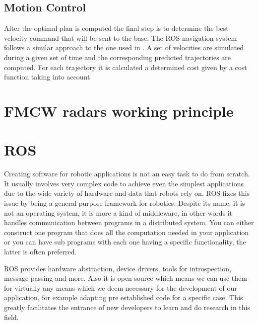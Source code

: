 \subsection{Motion Control}
After the optimal plan is computed the final step is to determine the best velocity command that will be sent to the base.  The ROS navigation system follows a similar approach to the one used in \cite{gerkey2008planning}. A set of velocities are simulated during a given set of time and the corresponding predicted trajectories are  computed. For each trajectory it is calculated a determined cost given by a cost function  taking into account 
\section {\ac{FMCW} radars working principle}

\section {ROS}
Creating software for robotic applications is not an easy task to do from scratch. It usually involves very complex code to achieve even the simplest applications due to the wide variety of hardware and data that robots rely on. \ac{ROS} fixes this issue by being a general purpose framework for robotics. Despite its name, it is not an operating system, it is more a kind of middleware, in other words it  handles communication between programs in a distributed system. You can either construct one program that does all the computation needed in your application or you can have sub programs with each one having a specific functionality, the latter is often preferred.

\ac{ROS} provides hardware abstraction, device drivers, tools for introspection, message-passing and more. Also it is open source which means we can use them for virtually any means which we deem necessary for the development of our application, for example adapting pre established code for a specific case. This greatly facilitates the entrance of new developers to learn and do research in this field.
